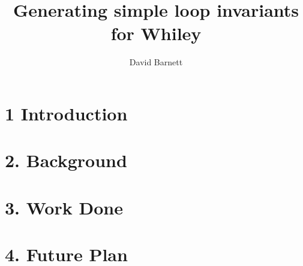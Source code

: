 \documentclass[11pt, a4paper, twoside, openright]{report}
\title{Generating simple loop invariants for Whiley}
\author{David Barnett}
\date{}
\begin{document}
\frontmatter


\begin{abstract}
\end{abstract}


\maketitle


\mainmatter


\section*{1 Introduction}

\section*{2. Background}

\section*{3. Work Done}

\section*{4. Future Plan}
\end{document}
